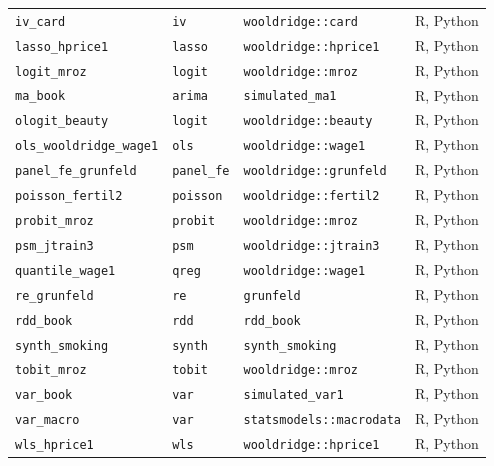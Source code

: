 {\begin{longtable}{llll}
\texttt{iv\_card} & \texttt{iv} & \texttt{wooldridge::card} & R, Python \\
\texttt{lasso\_hprice1} & \texttt{lasso} & \texttt{wooldridge::hprice1} & R, Python \\
\texttt{logit\_mroz} & \texttt{logit} & \texttt{wooldridge::mroz} & R, Python \\
\texttt{ma\_book} & \texttt{arima} & \texttt{simulated\_ma1} & R, Python \\
\texttt{ologit\_beauty} & \texttt{logit} & \texttt{wooldridge::beauty} & R, Python \\
\texttt{ols\_wooldridge\_wage1} & \texttt{ols} & \texttt{wooldridge::wage1} & R, Python \\
\texttt{panel\_fe\_grunfeld} & \texttt{panel\_fe} & \texttt{wooldridge::grunfeld} & R, Python \\
\texttt{poisson\_fertil2} & \texttt{poisson} & \texttt{wooldridge::fertil2} & R, Python \\
\texttt{probit\_mroz} & \texttt{probit} & \texttt{wooldridge::mroz} & R, Python \\
\texttt{psm\_jtrain3} & \texttt{psm} & \texttt{wooldridge::jtrain3} & R, Python \\
\texttt{quantile\_wage1} & \texttt{qreg} & \texttt{wooldridge::wage1} & R, Python \\
\texttt{re\_grunfeld} & \texttt{re} & \texttt{grunfeld} & R, Python \\
\texttt{rdd\_book} & \texttt{rdd} & \texttt{rdd\_book} & R, Python \\
\texttt{synth\_smoking} & \texttt{synth} & \texttt{synth\_smoking} & R, Python \\
\texttt{tobit\_mroz} & \texttt{tobit} & \texttt{wooldridge::mroz} & R, Python \\
\texttt{var\_book} & \texttt{var} & \texttt{simulated\_var1} & R, Python \\
\texttt{var\_macro} & \texttt{var} & \texttt{statsmodels::macrodata} & R, Python \\
\texttt{wls\_hprice1} & \texttt{wls} & \texttt{wooldridge::hprice1} & R, Python \\
\end{longtable}}
